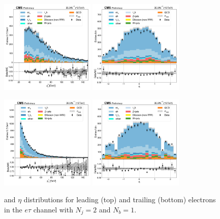 \begin{figure}[htb!]
    \centering
    \includegraphics[width=0.4\textwidth]{chapters/Analysis/sectionPlots/figures/data_mc_overlays/etau_2016_cat_eq2_eq1_signal_linear_lepton_lepton1_pt}
    \includegraphics[width=0.4\textwidth]{chapters/Analysis/sectionPlots/figures/data_mc_overlays/etau_2016_cat_eq2_eq1_signal_linear_lepton_lepton1_eta}

    \includegraphics[width=0.4\textwidth]{chapters/Analysis/sectionPlots/figures/data_mc_overlays/etau_2016_cat_eq2_eq1_signal_linear_lepton_lepton2_pt}
    \includegraphics[width=0.4\textwidth]{chapters/Analysis/sectionPlots/figures/data_mc_overlays/etau_2016_cat_eq2_eq1_signal_linear_lepton_lepton2_eta}
    \caption{\pt and $\eta$ distributions for leading (top) and trailing
        (bottom) electrons in the $e\tau$ channel with $N_{j} = 2$ and
        $N_{b} = 1$.}
    \label{fig:analysis:plots:etau_5_kinematic}
\end{figure}

